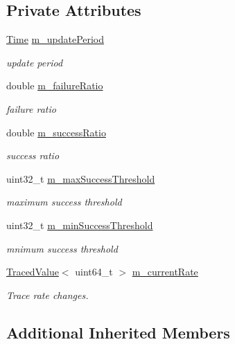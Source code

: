 \subsection*{Private Attributes}
\begin{DoxyCompactItemize}
\item 
\hyperlink{classns3_1_1Time}{Time} \hyperlink{classns3_1_1AmrrWifiManager_aa32a0ec8a3a3a68adc568c32f110abec}{m\+\_\+update\+Period}
\begin{DoxyCompactList}\small\item\em update period \end{DoxyCompactList}\item 
double \hyperlink{classns3_1_1AmrrWifiManager_a1e77031f6aaafd34ef3eaceef572ef64}{m\+\_\+failure\+Ratio}
\begin{DoxyCompactList}\small\item\em failure ratio \end{DoxyCompactList}\item 
double \hyperlink{classns3_1_1AmrrWifiManager_af27c355d85f1a9971976a8e40b427856}{m\+\_\+success\+Ratio}
\begin{DoxyCompactList}\small\item\em success ratio \end{DoxyCompactList}\item 
uint32\+\_\+t \hyperlink{classns3_1_1AmrrWifiManager_a76d77816378de62ab9b6d3f773490cf9}{m\+\_\+max\+Success\+Threshold}
\begin{DoxyCompactList}\small\item\em maximum success threshold \end{DoxyCompactList}\item 
uint32\+\_\+t \hyperlink{classns3_1_1AmrrWifiManager_a332a67b6b0cb14a3a4d410fda51c79c8}{m\+\_\+min\+Success\+Threshold}
\begin{DoxyCompactList}\small\item\em mnimum success threshold \end{DoxyCompactList}\item 
\hyperlink{classns3_1_1TracedValue}{Traced\+Value}$<$ uint64\+\_\+t $>$ \hyperlink{classns3_1_1AmrrWifiManager_a382d0bbc09b6dfb2f9e20a0aa1fbf9c1}{m\+\_\+current\+Rate}
\begin{DoxyCompactList}\small\item\em Trace rate changes. \end{DoxyCompactList}\end{DoxyCompactItemize}
\subsection*{Additional Inherited Members}



